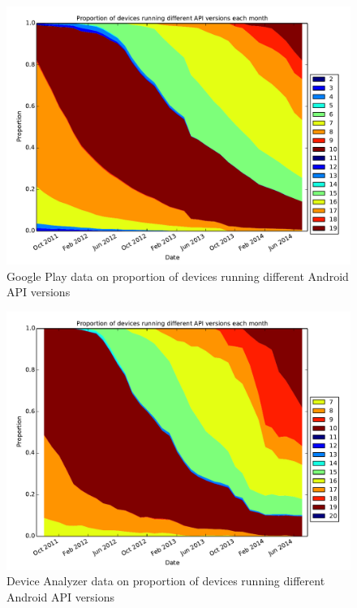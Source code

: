 \documentclass[conference,a4paper,twoside]{IEEEtran}
\begin{document}
\begin{figure}
 \centering
 \includegraphics[width=\columnwidth]{figures/googleplayapi}
 \caption{Google Play data on proportion of devices running different Android API versions}
 \label{fig:play_api}
\end{figure}
\begin{figure}
 \centering
 \includegraphics[width=\columnwidth]{figures/norm_api_gpcomp}
 \caption{Device Analyzer data on proportion of devices running different Android API versions}
 \label{fig:da_api}
\end{figure}
\end{document}

